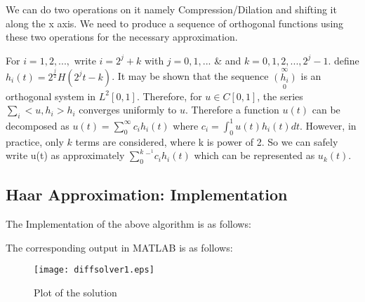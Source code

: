 We can do two operations on it namely Compression/Dilation and shifting it along the x axis. We need to produce a sequence of orthogonal functions using these two operations for the necessary approximation. \vspace{0.5cm}

\setlength{\parindent}{0ex}For $i=1,2,...,$ write $i=2^j+k$ with $j=0,1,...$ & and $k=0,1,2,...,2^j-1$. 
define $h_i(t) = 2^\frac{j}{2}H(2^j t-k)$. It may be shown that the sequence $(h_i) \limits_0^\infty$ is an orthogonal system in $L^2[0,1]$. Therefore, for $u \in C[0,1]$, the series $\sum_i <u,h_i> h_i$ converges uniformly to $u$. Therefore a function $u(t)$ can be decomposed as $u(t)=\sum_0^\infty c_ih_i(t)$ where $c_i = \int_0^1 u(t)h_i(t)dt$. However, in practice, only $k$ terms are considered, where k is power of 2. So we can safely write 
u(t) as approximately $\sum_0^k^-^1 c_ih_i(t)$ which can be represented as $u_k(t)$.
\\
\subsection{Haar Approximation: Implementation}

The Implementation of the above algorithm is as follows:
{\selectfont }

The corresponding output in MATLAB is as follows:\\ 
\begin{figure}[h]

\centering

    \texttt{[image: diffsolver1.eps]}

    \caption{Plot of the solution}

\end{figure} 


